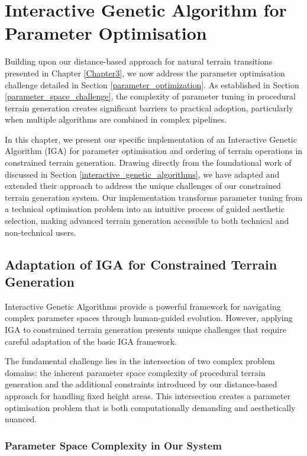 \chapter{Interactive Genetic Algorithm for Parameter Optimisation}
\label{Chapter4}

Building upon our distance-based approach for natural terrain transitions presented in Chapter \ref{Chapter3}, we now address the parameter optimisation challenge detailed in Section \ref{parameter_optimization}. As established in Section \ref{parameter_space_challenge}, the complexity of parameter tuning in procedural terrain generation creates significant barriers to practical adoption, particularly when multiple algorithms are combined in complex pipelines.

In this chapter, we present our specific implementation of an Interactive Genetic Algorithm (IGA) for parameter optimisation and ordering of terrain operations in constrained terrain generation. Drawing directly from the foundational work of \textcite{Walsh10} discussed in Section \ref{interactive_genetic_algorithms}, we have adapted and extended their approach to address the unique challenges of our constrained terrain generation system. Our implementation transforms parameter tuning from a technical optimisation problem into an intuitive process of guided aesthetic selection, making advanced terrain generation accessible to both technical and non-technical users.

\section{Adaptation of IGA for Constrained Terrain Generation}

Interactive Genetic Algorithms provide a powerful framework for navigating complex parameter spaces through human-guided evolution. However, applying IGA to constrained terrain generation presents unique challenges that require careful adaptation of the basic IGA framework.

The fundamental challenge lies in the intersection of two complex problem domains: the inherent parameter space complexity of procedural terrain generation and the additional constraints introduced by our distance-based approach for handling fixed height areas. This intersection creates a parameter optimisation problem that is both computationally demanding and aesthetically nuanced.

\subsection{Parameter Space Complexity in Our System}

